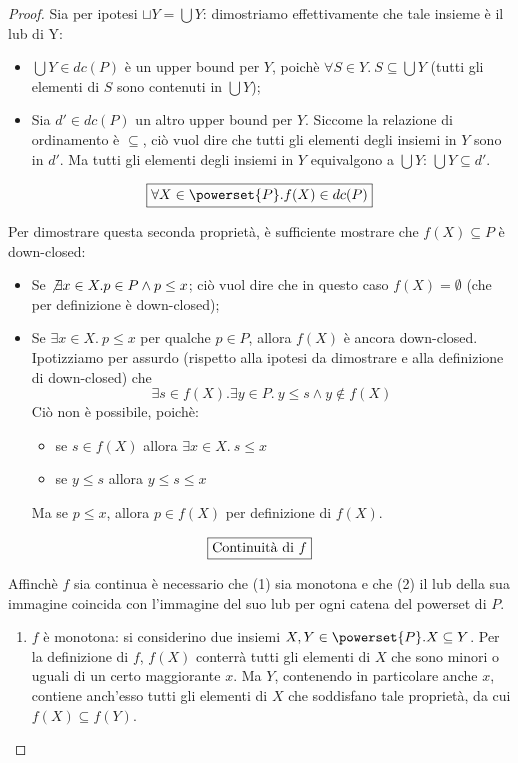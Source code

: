 \begin{proof}
Sia per ipotesi $\sqcup Y = \bigcup Y$: dimostriamo effettivamente che tale
insieme è il lub di Y:
\begin{itemize}
  \item $\bigcup Y \in dc(P)$ è un upper bound per $Y$, poichè
    $\forall{S}\in Y.\ S \subseteq \bigcup Y$ (tutti gli elementi di $S$ sono
    contenuti in $\bigcup Y$);
  \item Sia $d'\in dc(P)$ un altro upper bound per $Y$. Siccome la relazione di
    ordinamento è $\subseteq$, ciò vuol dire che tutti gli elementi degli
    insiemi in $Y$ sono in $d'$. Ma tutti gli elementi degli insiemi in $Y$
    equivalgono a $\bigcup Y$: $\bigcup Y \subseteq d'$.
\end{itemize}

$$
\boxer{\forall{X} \in \powerset{P}. f(X) \in dc(P)}
$$

Per dimostrare questa seconda proprietà, è sufficiente mostrare che
$f(X) \subseteq P$ è down-closed:

\begin{itemize}
  \item Se $\not \exists{x}\in X. p\in P \land p \leq x$; ciò vuol dire che in
    questo caso $f(X) = \emptyset$ (che per definizione è down-closed);
  \item Se $\exists{x}\in X.\ p \leq x$ per qualche $p \in P$, allora $f(X)$ è
    ancora down-closed. Ipotizziamo per assurdo (rispetto alla ipotesi da
    dimostrare e alla definizione di down-closed) che
    $$
    \exists{s\in f(X)}.\exists{y}\in P.\ y \leq s \land y \not \in f(X)
    $$
    Ciò non è possibile, poichè:
    \begin{itemize}
      \item se $s \in f(X)$ allora $\exists{x}\in X.\ s \leq x$
      \item se $y \leq s$ allora $y \leq s \leq x$
    \end{itemize}
    Ma se $p \leq x$, allora $p \in f(X)$ per definizione di $f(X)$.
\end{itemize}

$$
\boxed{\text{Continuità di } f}
$$

Affinchè $f$ sia continua è necessario che (1) sia monotona e che (2) il lub
della sua immagine coincida con l'immagine del suo lub per ogni catena del
powerset di $P$.

\begin{enumerate}
  \item $f$ è monotona: si considerino due insiemi
    $X,Y\in \powerset{P}. X \subseteq Y$. Per la definizione di $f$, $f(X)$ conterrà
    tutti gli elementi di $X$ che sono minori o uguali di un certo maggiorante
    $x$.
    Ma $Y$, contenendo in particolare anche $x$, contiene anch'esso tutti gli
    elementi di $X$ che soddisfano tale proprietà, da cui
    $f(X) \subseteq f(Y)$.


\end{enumerate}
\end{proof}

